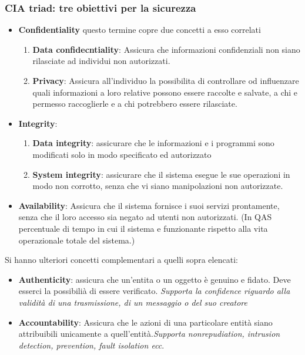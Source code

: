 \documentclass[12pt]{article}
\begin{document}
		\subsubsection{CIA triad: tre obiettivi per la sicurezza}
			\begin{itemize}
				\item \textbf{Confidentiality} questo termine copre due concetti a esso correlati 
				\begin{enumerate}
					\item \textbf{Data confidecntiality}: Assicura che informazioni confidenziali non siano rilasciate ad individui non autorizzati.
					\item \textbf{Privacy}: Assicura all'individuo la possibilita di controllare od influenzare quali informazioni a loro relative possono essere raccolte e salvate, a chi e permesso raccoglierle e a chi potrebbero essere rilasciate.
				\end{enumerate}
				\item \textbf{Integrity}:
				 \begin{enumerate}
					\item \textbf{Data integrity}: assicurare che le informazioni e i programmi sono modificati solo in modo specificato ed autorizzato
					\item \textbf{System integrity}: assicurare che il sistema esegue le sue operazioni in modo non corrotto, senza che vi siano manipolazioni non autorizzate.
				\end{enumerate}
				\item \textbf{Availability}: Assicura che il sistema fornisce i suoi servizi prontamente, senza che il loro accesso sia negato ad utenti non autorizzati. (In QAS percentuale di tempo in cui il sistema e funzionante rispetto alla vita operazionale totale del sistema.)
			\end{itemize}
			Si hanno ulteriori concetti complementari a quelli sopra elencati:
			\begin{itemize}
				\item \textbf{Authenticity}: assicura che un'entita o un oggetto è genuino e fidato. Deve esserci la possibilià di essere verificato. \textit{Supporta la confidence riguardo alla validità di una trasmissione, di un messaggio o del suo creatore}
				\item \textbf{Accountability}: Assicura che le azioni di una particolare entità siano attribuibili unicamente a quell'entità.\textit{Supporta nonrepudiation, intrusion detection, prevention, fault isolation ecc}.
			\end{itemize}	
\end{document}
